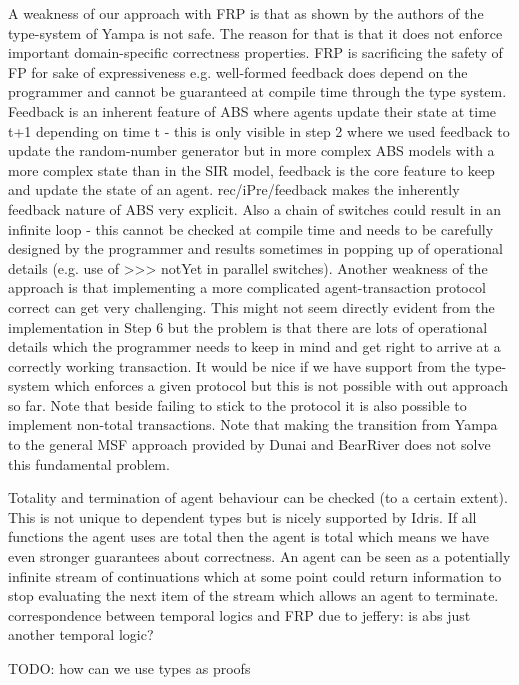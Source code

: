 A weakness of our approach with FRP is that as shown by the authors of \cite{sculthorpe_safe_2009} the type-system of Yampa is not safe. The reason for that is that it does not enforce important domain-specific correctness properties. FRP is sacrificing the safety of FP for sake of expressiveness e.g. well-formed feedback does depend on the programmer and cannot be guaranteed at compile time through the type system. Feedback is an inherent feature of ABS where agents update their state at time t+1 depending on time t - this is only visible in step 2 where we used feedback to update the random-number generator but in more complex ABS models with a more complex state than in the SIR model, feedback is the core feature to keep and update the state of an agent.  rec/iPre/feedback makes the inherently feedback nature of ABS very explicit. Also a chain of switches could result in an infinite loop - this cannot be checked at compile time and needs to be carefully designed by the programmer and results sometimes in popping up of operational details (e.g. use of >>> notYet in parallel switches).
Another weakness of the approach is that implementing a more complicated agent-transaction protocol correct can get very challenging. This might not seem directly evident from the implementation in Step 6 but the problem is that there are lots of operational details which the programmer needs to keep in mind and get right to arrive at a correctly working transaction. It would be nice if we have support from the type-system which enforces a given protocol but this is not possible with out approach so far. Note that beside failing to stick to the protocol it is also possible to implement non-total transactions.
Note that making the transition from Yampa to the general MSF approach provided by Dunai and BearRiver does not solve this fundamental problem.

Totality and termination of agent behaviour can be checked (to a certain extent). This is not unique to dependent types but is nicely supported by Idris. If all functions the agent uses are total then the agent is total which means we have even stronger guarantees about correctness. 
An agent can be seen as a potentially infinite stream of continuations which at some point could return information to stop evaluating the next item of the stream which allows an agent to terminate.
correspondence between temporal logics and FRP due to jeffery: is abs just another temporal logic?

TODO: how can we use types as proofs

